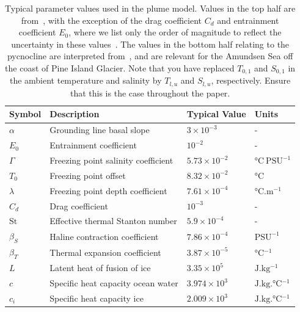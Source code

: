 \documentclass[openacc]{rsproca_new}%
\newcommand{\red}[1]{{\color{red} #1}}
\begin{document}
\begin{table}[!h]
\caption{Typical parameter values used in the plume model. Values in the top half are from~\cite{Jenkins1991JGeophysResOceans}, with the exception of the drag coefficient $C_d$ and entrainment coefficient $E_0$, where we list only the order of magnitude to reflect the uncertainty in these values~\citep{Hewitt2020AnnRevFlu}. The values in the bottom half relating to the pycnocline are interpreted from~\cite{Jenkins2018NatureGeo}, and are relevant for the Amundsen Sea off the coast of Pine Island Glacier. \red{Note that you have replaced $T_{0,1}$ and $S_{0,1}$ in the ambient temperature and salinity by $T_{l,u}$ and $S_{l,u}$, respectively. Ensure that this is the case throughout the paper.}}\label{T:Constants}
\begin{center}
\begin{tabular}{llll}%
\hline
Symbol & Description & Typical Value & Units \\
\hline
$\alpha$ &Grounding line basal slope &$3\times 10^{-3}$ &- \\
$E_0$   & Entrainment coefficient    & $10^{-2}$ & -       \\
$\Gamma$      & Freezing point salinity coefficient & $5.73 \times 10^{-2}	$    	  &  $\si{\celsius}~\text{PSU}^{-1}$     \\
$T_0$      & Freezing point offset & $8.32 \times 10^{-2}	$    	  &  $\si{ \celsius}$     \\
$\lambda$      & Freezing point depth coefficient & $7.61 \times 10^{-4}	$    	  &  $\si{\celsius . \meter^{-1}}$     \\
$C_d$ & Drag coefficient & $10^{-3}$ & - \\
$\mathrm{St}$ & Effective thermal Stanton number & $5.9 \times 10^{-4}$ & -\\
$\beta_S$ & Haline contraction coefficient & $7.86 \times 10^{-4} $ & $\text{PSU}^{-1}$ \\
$\beta_T$ & Thermal expansion coefficient & $3.87\times 10^{-5}$ & $\si{\celsius^{-1}}$ \\
$L$ & Latent heat of fusion of ice & $3.35 \times 10^5 $& $\si{\joule . \kg^{-1}}$\\
$c$ & Specific heat capacity ocean water & $3.974 \times 10^3$ & $\si{\joule .\kilogram .\celsius^{-1}}$\\
$c_i$ & Specific heat capacity ice & $2.009 \times 10^3$ & $\si{\joule . \kilogram .\celsius^{-1}}$\\


\end{tabular}
\end{center}
\end{table}
\end{document}
